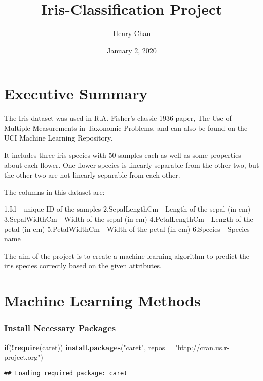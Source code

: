 \documentclass[]{article}
\title{Iris-Classification Project}
\author{Henry Chan}
\date{January 2, 2020}
\newenvironment{Shaded}{\begin{snugshade}}{\end{snugshade}}
\newcommand{\KeywordTok}[1]{\textcolor[rgb]{0.13,0.29,0.53}{\textbf{#1}}}
\newcommand{\DataTypeTok}[1]{\textcolor[rgb]{0.13,0.29,0.53}{#1}}
\newcommand{\StringTok}[1]{\textcolor[rgb]{0.31,0.60,0.02}{#1}}
\newcommand{\ControlFlowTok}[1]{\textcolor[rgb]{0.13,0.29,0.53}{\textbf{#1}}}
\newcommand{\OperatorTok}[1]{\textcolor[rgb]{0.81,0.36,0.00}{\textbf{#1}}}
\newcommand{\NormalTok}[1]{#1}
\begin{document}
\maketitle

\section{Executive Summary}\label{executive-summary}

The Iris dataset was used in R.A. Fisher's classic 1936 paper, The Use
of Multiple Measurements in Taxonomic Problems, and can also be found on
the UCI Machine Learning Repository.

It includes three iris species with 50 samples each as well as some
properties about each flower. One flower species is linearly separable
from the other two, but the other two are not linearly separable from
each other.

The columns in this dataset are:

1.Id - unique ID of the samples 2.SepalLengthCm - Length of the sepal
(in cm) 3.SepalWidthCm - Width of the sepal (in cm) 4.PetalLengthCm -
Length of the petal (in cm) 5.PetalWidthCm - Width of the petal (in cm)
6.Species - Species name

The aim of the project is to create a machine learning algorithm to
predict the iris species correctly based on the given attributes.

\section{Machine Learning Methods}\label{machine-learning-methods}

\subsubsection{Install Necessary
Packages}\label{install-necessary-packages}

\begin{Shaded}
\begin{Highlighting}[]
\ControlFlowTok{if}\NormalTok{(}\OperatorTok{!}\KeywordTok{require}\NormalTok{(caret)) }\KeywordTok{install.packages}\NormalTok{(}\StringTok{"caret"}\NormalTok{, }\DataTypeTok{repos =} \StringTok{"http://cran.us.r-project.org"}\NormalTok{)}
\end{Highlighting}
\end{Shaded}

\begin{verbatim}
## Loading required package: caret
\end{verbatim}
\end{document}
